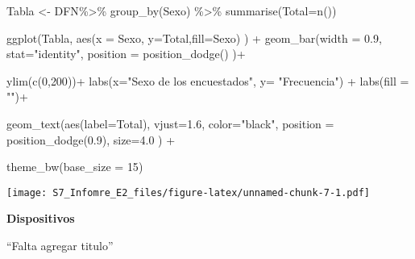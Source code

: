 \documentclass[
]{article}
\newenvironment{Shaded}{\begin{snugshade}}{\end{snugshade}}
\newcommand{\AttributeTok}[1]{\textcolor[rgb]{0.77,0.63,0.00}{#1}}
\newcommand{\DecValTok}[1]{\textcolor[rgb]{0.00,0.00,0.81}{#1}}
\newcommand{\FloatTok}[1]{\textcolor[rgb]{0.00,0.00,0.81}{#1}}
\newcommand{\FunctionTok}[1]{\textcolor[rgb]{0.00,0.00,0.00}{#1}}
\newcommand{\NormalTok}[1]{#1}
\newcommand{\OtherTok}[1]{\textcolor[rgb]{0.56,0.35,0.01}{#1}}
\newcommand{\SpecialCharTok}[1]{\textcolor[rgb]{0.00,0.00,0.00}{#1}}
\newcommand{\StringTok}[1]{\textcolor[rgb]{0.31,0.60,0.02}{#1}}
\begin{document}
\begin{Shaded}
\begin{Highlighting}[]
\NormalTok{Tabla }\OtherTok{\textless{}{-}}\NormalTok{ DFN}\SpecialCharTok{\%\textgreater{}\%} \FunctionTok{group\_by}\NormalTok{(Sexo) }\SpecialCharTok{\%\textgreater{}\%} \FunctionTok{summarise}\NormalTok{(}\AttributeTok{Total=}\FunctionTok{n}\NormalTok{())   }
    
\FunctionTok{ggplot}\NormalTok{(Tabla, }\FunctionTok{aes}\NormalTok{(}\AttributeTok{x =}\NormalTok{ Sexo, }\AttributeTok{y=}\NormalTok{Total,}\AttributeTok{fill=}\NormalTok{Sexo) ) }\SpecialCharTok{+}    
  \FunctionTok{geom\_bar}\NormalTok{(}\AttributeTok{width =} \FloatTok{0.9}\NormalTok{, }\AttributeTok{stat=}\StringTok{"identity"}\NormalTok{,              }
           \AttributeTok{position =} \FunctionTok{position\_dodge}\NormalTok{()                 )}\SpecialCharTok{+}  
  
  \FunctionTok{ylim}\NormalTok{(}\FunctionTok{c}\NormalTok{(}\DecValTok{0}\NormalTok{,}\DecValTok{200}\NormalTok{))}\SpecialCharTok{+}
  \FunctionTok{labs}\NormalTok{(}\AttributeTok{x=}\StringTok{"Sexo de los encuestados"}\NormalTok{, }\AttributeTok{y=} \StringTok{"Frecuencia"}\NormalTok{) }\SpecialCharTok{+}   
  \FunctionTok{labs}\NormalTok{(}\AttributeTok{fill =} \StringTok{""}\NormalTok{)}\SpecialCharTok{+}                                         
  
  \FunctionTok{geom\_text}\NormalTok{(}\FunctionTok{aes}\NormalTok{(}\AttributeTok{label=}\NormalTok{Total), }\AttributeTok{vjust=}\FloatTok{1.6}\NormalTok{, }\AttributeTok{color=}\StringTok{"black"}\NormalTok{,    }
              \AttributeTok{position =} \FunctionTok{position\_dodge}\NormalTok{(}\FloatTok{0.9}\NormalTok{),  }\AttributeTok{size=}\FloatTok{4.0}
\NormalTok{            ) }\SpecialCharTok{+}                                            
  
  \FunctionTok{theme\_bw}\NormalTok{(}\AttributeTok{base\_size =} \DecValTok{15}\NormalTok{)}
\end{Highlighting}
\end{Shaded}

\texttt{[image: S7\_Infomre\_E2\_files/figure-latex/unnamed-chunk-7-1.pdf]}

\textbf{Dispositivos}

``Falta agregar titulo''
\end{document}
